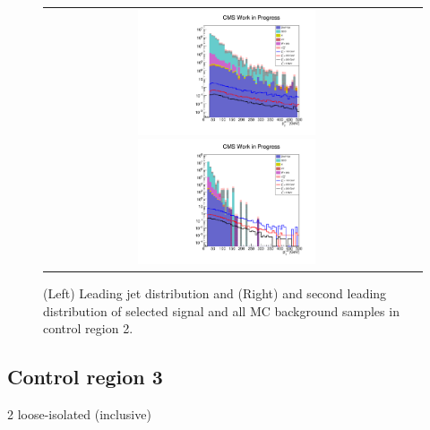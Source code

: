 \begin{figure}[tbh!]
	\centering
	\begin{tabular}{cc}
		\includegraphics[width=0.5\textwidth]{analysis/pics/h_jet1pt_Tau2TightIsoVBFInverted.pdf}
		\includegraphics[width=0.5\textwidth]{analysis/pics/h_tau2pt_Tau2TightIsoVBFInverted.pdf}
	\end{tabular}
	\caption{(Left) Leading jet \pt distribution and (Right) and second leading \hadtau \pt distribution of selected signal and all MC background samples in control region 2.}
	\label{fig::crplots2_Taui2TightIsoVBFInverted_13tev}
\end{figure}

\subsection*{Control region 3}

\FloatBarrier

2 loose-isolated \hadtau (inclusive)

